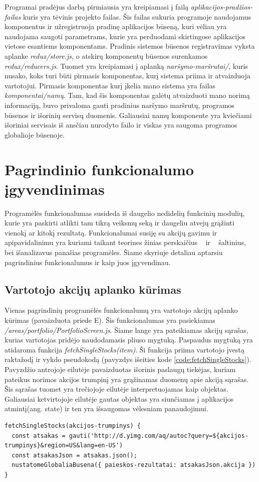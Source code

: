 \documentclass[a4paper,12pt,fleqn]{article}
\begin{document}
Programai pradėjus darbą pirmiausia yra kreipiamasi į failą \textit{aplikacijos-pradžios-failas} kuris yra tėvinis projekto failas. Šis failas sukuria programoje naudojamus komponentus ir užregistruoja pradinę aplikacijos būseną, kuri vėliau yra naudojama saugoti parametrams, kurie yra perduodami skirtingose aplikacijos vietose esantiems komponentams. Pradinis sistemos būsenos registravimas vyksta aplanke \textit{redux/store.js}, o atskirų komponentų būsenos surenkamos \textit{redux/reducers.js}. Tuomet yra kreipiamasi į aplanką \textit{naršymo-maršrutai/}, kuris nusako, koks turi būti pirmasis komponentas, kurį sistema priima ir atvaizduoja vartotojui. Pirmasis komponentas kurį įkelia mano sistema yra failas \textit{komponentai/namų}. Tam, kad šis komponentas galėtų atvaizduoti mano norimą informaciją, buvo privaloma gauti pradinius naršymo maršrutų, programos būsenos ir išorinių servisų duomenis. Galiausiai namų komponente yra kviečiami išoriniai servisais iš ansčiau nurodyto failo ir viskas yra saugoma programos globalioje būsenoje.

\newpage
\section{Pagrindinio funkcionalumo įgyvendinimas}
Programėlės funkcionalumas susideda iš daugelio nedidelių funkcinių modulių, kurie yra paskirti atlikti tam tikrą veiksmų seką ir daugeliu atvejų grąžinti vienokį ar kitokį rezultatą. Funkcionalumai susiję su akcijų gavimu ir apipavidalinimu yra kuriami taikant teorines žinias perskaičius ~\cite{IGR} ir ~\cite{JOA} šaltinius, bei išanalizavus panašias programėles. Šiame skyriuje detaliau aptarsiu pagrindinius funkcionalumus ir kaip juos įgyvendinau.
\subsection{Vartotojo akcijų aplanko kūrimas}
Vienas pagrindinių programėlės funkcionalumų yra vartotojo akcijų aplanko kūrimas (pavaizduota priede E). Šis funkcionalumas yra pasiekiamas \textit{/areas/portfolio/PortfolioScreen.js}. Šiame lange yra pateikiamas akcijų sąrašas, kurias vartotojas pridėjo naudodamasis pliuso mygtuką. Paspaudus mygtuką yra atidaroma funkcija \textit{fetchSingleStocks(item)}. Ši funkcija priima vartotojo įvestą raktažodį ir vykdo pseudokodą (pavyzdys išeities kode \ref{code:fetchSingleStocks}). Pavyzdžio antrojoje eilutėje pavaizduotas išorinis paslaugų tiekėjas, kuriam pateikus norimos akcijos trumpinį yra grąžinamas duomenų apie akciją sąrašas. Šis sąrašas tuomet yra trečiojoje eilutėje interpretuojamas kaip objektas. Galiausiai ketvirtojoje eilutėje gautas objektas yra siunčiamas į aplikacijos atmintį(ang. state) ir ten yra išsaugomas vėlesniam panaudojimui.
\begin{lstlisting}[caption={Funkcijos fetchSingleStocks() pseudokodas.},label={code:fetchSingleStocks}]
fetchSingleStocks(akcijos-trumpinys) {
  const atsakas = gauti('http://d.yimg.com/aq/autoc?query=${akcijos-trumpinys}&region=US&lang=en-US')
  const atsakasJson = atsakas.json();
  nustatomeGlobaliaBusena({ paieskos-rezultatai: atsakasJson.akcija })	
}
\end{lstlisting}
\end{document}
